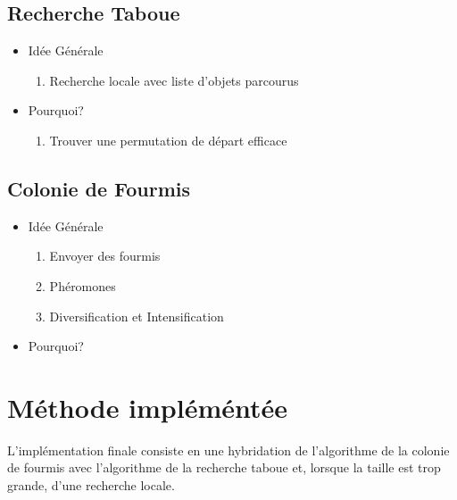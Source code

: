 \documentclass[b]{beamer}
\begin{document}
\subsection{Recherche Taboue}

\begin{frame}

	\begin{itemize}
		\item Idée Générale\\
		\begin{enumerate}
			\item Recherche locale avec liste d'objets parcourus 
		\end{enumerate}
		\item Pourquoi?\\
		\begin{enumerate}
			\item Trouver une permutation de départ efficace
		\end{enumerate}
	\end{itemize}

\end{frame}

\subsection{Colonie de Fourmis}

\begin{frame}

	\begin{itemize}
		\item Idée Générale\\
		\begin{enumerate}
			\item Envoyer des fourmis
			\item Phéromones\\
			\item Diversification et Intensification\\ 
		\end{enumerate}
%			
		\item Pourquoi?\\
	\end{itemize}
\end{frame}

\section{Méthode impléméntée}
\begin{frame}
	L'implémentation finale consiste en une hybridation de l'algorithme de la colonie de fourmis avec l'algorithme de la recherche taboue et, lorsque la taille est trop grande, d'une recherche locale.
\end{frame}
\end{document}
